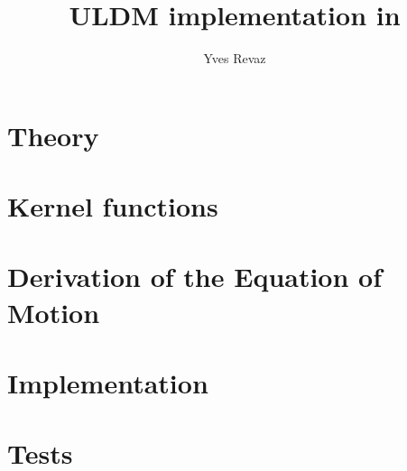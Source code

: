 \documentclass[fleqn, usenatbib, useAMS]{mnras}
\title{ULDM implementation in \swift}
\author{Yves Revaz}
\begin{document}
\maketitle

\section{Theory}


\section{Kernel functions}


\section{Derivation of the Equation of Motion}\label{sec:derivation}


\section{Implementation}\label{sec:implementation}


\section{Tests}\label{sec:tests}




\end{document}
